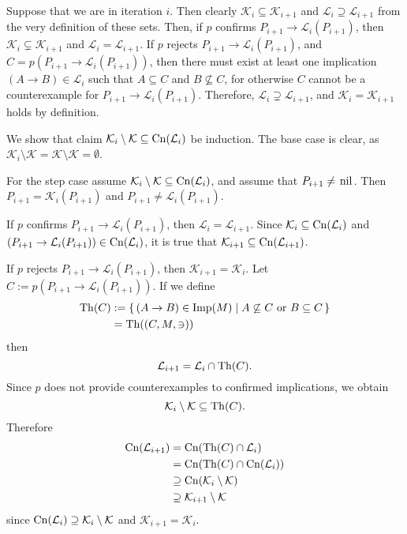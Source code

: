 \begin{Proof}
  Suppose that we are in iteration $i$.  Then clearly $\mathcal{K}_i \subseteq
  \mathcal{K}_{i+1}$ and $\mathcal{L}_i \supseteq \mathcal{L}_{i+1}$ from the very
  definition of these sets.  Then, if $p$ confirms $P_{i+1} \to \mathcal{L}_i(P_{i+1})$,
  then $\mathcal{K}_i \subsetneq \mathcal{K}_{i+1}$ and $\mathcal{L}_i =
  \mathcal{L}_{i+1}$.  If $p$ rejects $P_{i+1} \to \mathcal{L}_i(P_{i+1})$, and $C =
  p(P_{i+1} \to \mathcal{L}_i(P_{i+1}))$, then there must exist at least one implication
  $(A \to B) \in \mathcal{L}_i$ such that $A \subseteq C$ and $B \not\subseteq C$, for
  otherwise $C$ cannot be a counterexample for $P_{i+1} \to \mathcal{L}_i(P_{i+1})$.
  Therefore, $\mathcal{L}_i \supsetneq \mathcal{L}_{i+1}$, and $\mathcal{K}_i =
  \mathcal{K}_{i+1}$ holds by definition.

  We show that claim $\mathcal{K}_i \setminus \mathcal{K} \subseteq \operatorname{Cn}(\mathcal{L}_i)$ be
  induction.  The base case is clear, as $\mathcal{K}_i \setminus \mathcal{K} =
  \mathcal{K} \setminus \mathcal{K} = \emptyset$.

  For the step case assume $\mathcal{K}_i\setminus \mathcal{K} \subseteq
  \operatorname{Cn}(\mathcal{L}_i)$, and assume that $P_{i+1} \neq \text{\lstinline{nil}}$.  Then
  $P_{i+1} = \mathcal{K}_i(P_{i+1})$ and $P_{i+1} \neq \mathcal{L}_i(P_{i+1})$.

  If $p$ confirms $P_{i+1} \to \mathcal{L}_i(P_{i+1})$, then $\mathcal{L}_i =
  \mathcal{L}_{i+1}$.  Since $\mathcal{K}_i \subseteq \operatorname{Cn}(\mathcal{L}_i)$ and $(P_{i+1}
  \to \mathcal{L}_i(P_{i+1})) \in \operatorname{Cn}(\mathcal{L}_i)$, it is true that $\mathcal{K}_{i+1}
  \subseteq \operatorname{Cn}(\mathcal{L}_{i+1})$.

  If $p$ rejects $P_{i+1} \to \mathcal{L}_i(P_{i+1})$, then $\mathcal{K}_{i+1} =
  \mathcal{K}_i$.  Let $C := p(P_{i+1} \to \mathcal{L}_i(P_{i+1}))$.  If we define
  \begin{align*}
    \operatorname{Th}(C)
    &:= {\{\, (A \to B) \in \operatorname{Imp}(M) \mid A \not\subseteq C \text{ or } B \subseteq C \,\}} \\
    &= \operatorname{Th}((C, M, \ni))
  \end{align*}
  then
  \begin{equation*}
    \mathcal{L}_{i+1} = \mathcal{L}_i \cap \operatorname{Th}(C).
  \end{equation*}
  Since $p$ does not provide counterexamples to confirmed implications, we obtain
  \begin{equation*}
    \mathcal{K}_i \setminus \mathcal{K} \subseteq \operatorname{Th}(C).
  \end{equation*}
  Therefore
  \begin{align*}
    \operatorname{Cn}(\mathcal{L}_{i+1})
    &= \operatorname{Cn}(\operatorname{Th}(C) \cap \mathcal{L}_i) \\
    &= \operatorname{Cn}(\operatorname{Th}(C) \cap \operatorname{Cn}(\mathcal{L}_i)) \\
    &\supseteq \operatorname{Cn}(\mathcal{K}_i \setminus \mathcal{K}) \\
    &\supseteq \mathcal{K}_{i+1} \setminus \mathcal{K}
  \end{align*}
  since $\operatorname{Cn}(\mathcal{L}_i) \supseteq \mathcal{K}_i \setminus \mathcal{K}$ and
  $\mathcal{K}_{i+1} = \mathcal{K}_i$.
\end{Proof}


